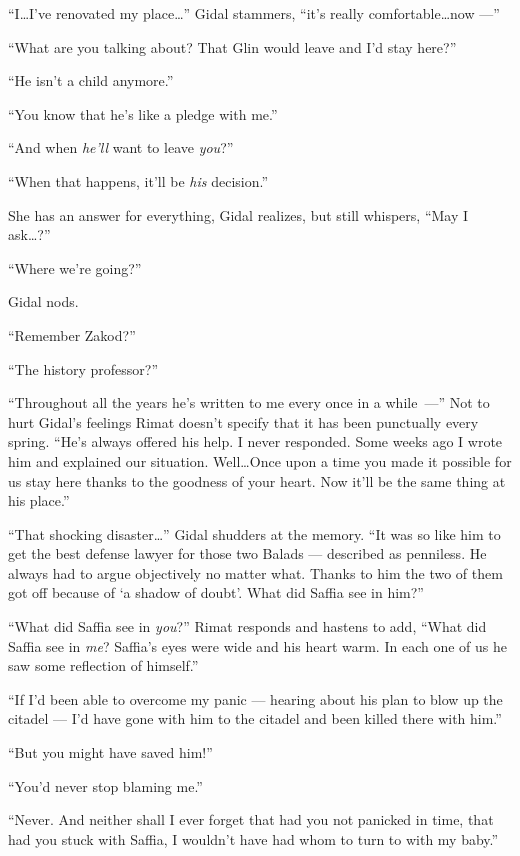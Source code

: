 \documentclass[twoside,11pt,openany]{book}
\begin{document}
``I{\ldots}I've renovated my place{\ldots}'' Gidal stammers, ``it's really
comfortable{\ldots}now ---''

``What are you talking about?  That Glin would leave and I'd stay here?''

``He isn't a child anymore.''

``You know that he's like a pledge{ }with me.''

``And when\textit{ he'll} want to leave \textit{you}?''

``When that happens, it'll be \textit{his} decision.''

She has an answer for everything, Gidal realizes, but still whispers, ``May I ask{\ldots}?''

``Where we're going?''

Gidal nods.

``Remember Zakod?''

``The history professor?''

``Throughout all the years he's written to me every once in a \hbox{while~---''}
Not to hurt Gidal's
feelings Rimat doesn't specify that it has been{ }{punctually}{ }every
spring. ``He's always offered his help. I never responded. Some weeks ago I wrote him and explained our
situation. Well{\ldots}Once upon a time you made it possible for us stay here thanks to{ }the goodness
of your heart. Now it'll be the same thing at his place.''

``That shocking disaster{\ldots}'' Gidal  shudders at
the memory. ``It was so like him to get the best defense lawyer for those two Balads ---
described as penniless. He always had to argue objectively no matter what. Thanks to him the two of them got off
because of `a shadow of doubt'. What did Saffia see in him?''

``What did Saffia see in \textit{you}?'' Rimat responds and hastens to add,
``What did Saffia see in \textit{me}? Saffia's eyes were wide and his heart warm. In each one of us he saw
some reflection of himself.''

``If I'd been able to overcome my panic --- hearing about his plan to blow up the citadel --- I'd have gone
with him to the citadel and been killed there with him.''

``But you might have saved him!''

``You'd never stop blaming me.''

``Never. And neither shall I ever forget that had you not panicked in time, that had you stuck with
Saffia, I wouldn't have had whom to turn to with my baby.''
\end{document}
